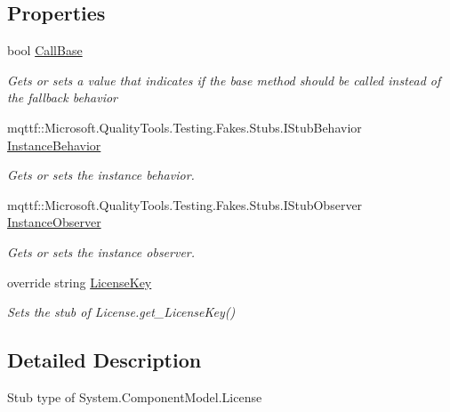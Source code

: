 \subsection*{Properties}
\begin{DoxyCompactItemize}
\item 
bool \hyperlink{class_system_1_1_component_model_1_1_fakes_1_1_stub_license_abbf73843cc0c33449b0c3111cde31cfd}{Call\-Base}
\begin{DoxyCompactList}\small\item\em Gets or sets a value that indicates if the base method should be called instead of the fallback behavior\end{DoxyCompactList}\item 
mqttf\-::\-Microsoft.\-Quality\-Tools.\-Testing.\-Fakes.\-Stubs.\-I\-Stub\-Behavior \hyperlink{class_system_1_1_component_model_1_1_fakes_1_1_stub_license_a53f28732537c9136c03fde3f73c8b000}{Instance\-Behavior}
\begin{DoxyCompactList}\small\item\em Gets or sets the instance behavior.\end{DoxyCompactList}\item 
mqttf\-::\-Microsoft.\-Quality\-Tools.\-Testing.\-Fakes.\-Stubs.\-I\-Stub\-Observer \hyperlink{class_system_1_1_component_model_1_1_fakes_1_1_stub_license_ab95a2cef3bd0f0217a9c3cc495e25906}{Instance\-Observer}
\begin{DoxyCompactList}\small\item\em Gets or sets the instance observer.\end{DoxyCompactList}\item 
override string \hyperlink{class_system_1_1_component_model_1_1_fakes_1_1_stub_license_a97d94ec65759d2112cc74a82d5c828e2}{License\-Key}
\begin{DoxyCompactList}\small\item\em Sets the stub of License.\-get\-\_\-\-License\-Key()\end{DoxyCompactList}\end{DoxyCompactItemize}


\subsection{Detailed Description}
Stub type of System.\-Component\-Model.\-License



